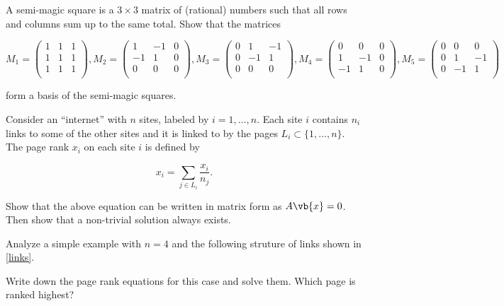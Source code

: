 \documentclass[a4paper,12pt]{report}
\begin{document}
{A semi-magic square is a \(3 \times 3\) matrix of (rational) numbers such that all rows and columns sum
up to the same total. Show that the matrices

\begin{equation}
    M_1  = \begin{pmatrix}
        1 & 1 &  1 \\
        1 & 1 &  1 \\
        1 & 1 &  1 \\
    \end{pmatrix}, M_2  = \begin{pmatrix}
        1 & -1 &  0 \\
        -1 & 1 &  0 \\
        0 & 0 &  0 \\
    \end{pmatrix}, M_3 = \begin{pmatrix}
        0 & 1 &  -1 \\
        0 & -1 &  1 \\
        0 & 0 &  0 \\
    \end{pmatrix}, M_4 = \begin{pmatrix}
        0 & 0 &  0 \\
        1 & -1 &  0 \\
        -1 & 1 &  0 \\
    \end{pmatrix}, M_5 = \begin{pmatrix}
        0 & 0 &  0 \\
        0 & 1 &  -1 \\
        0 & -1 &  1 \\
    \end{pmatrix}
\end{equation}

form a basis of the semi-magic squares.}
{} 

{ Consider an “internet” with \(n\) sites, labeled by \(i = 1, \ldots , n\). Each site \(i\) contains \(n_{i} \) links to some of the other sites and it is linked to by the pages \(L_{i} \subset \{1,\ldots ,n\}\). The page rank \(x_{i} \) on each site \(i\) is defined by 

\begin{equation}
    x_{i} = \sum_{j \in L_{i} }^{} \frac{x_{i} }{n_{j} }.    
\end{equation}

Show that the above equation can be written in matrix form as \(A\vb{x} = 0\). Then show that a non-trivial solution always exists. 

Analyze a simple example with \(n=4\) and the following struture of links shown in \cref{links}.

Write down the page rank equations for this case and solve them. Which page is ranked highest?
}
{} 
\end{document}
